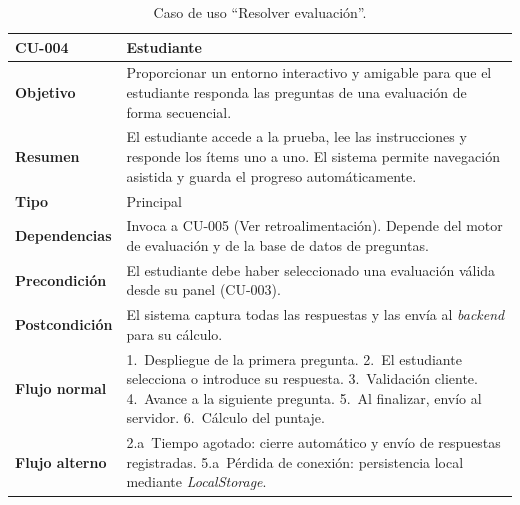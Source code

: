 \begin{table}[H]
\centering
\caption{Caso de uso ``Resolver evaluación''.}
\label{tab:cu_resolver}
\begin{small}
\begin{tabularx}{\textwidth}{|L{3cm}|X|}
\hline
{}
 CU-004 &  Estudiante\\
\hline
\textbf{Objetivo} & Proporcionar un entorno interactivo y amigable para que el estudiante responda las preguntas de una evaluación de forma secuencial.\\
\hline
\textbf{Resumen} & El estudiante accede a la prueba, lee las instrucciones y responde los ítems uno a uno. El sistema permite navegación asistida y guarda el progreso automáticamente.\\
\hline
\textbf{Tipo} & Principal\\
\hline
\textbf{Dependencias} & Invoca a CU-005 (Ver retroalimentación). Depende del motor de evaluación y de la base de datos de preguntas.\\
\hline
\textbf{Precondición} & El estudiante debe haber seleccionado una evaluación válida desde su panel (CU-003).\\
\hline
\textbf{Postcondición} & El sistema captura todas las respuestas y las envía al \textit{backend} para su cálculo.\\
\hline
\textbf{Flujo normal} & 1.~Despliegue de la primera pregunta. 2.~El estudiante selecciona o introduce su respuesta. 3.~Validación cliente. 4.~Avance a la siguiente pregunta. 5.~Al finalizar, envío al servidor. 6.~Cálculo del puntaje.\\
\hline
\textbf{Flujo alterno} & 2.a~Tiempo agotado: cierre automático y envío de respuestas registradas. 5.a~Pérdida de conexión: persistencia local mediante \textit{LocalStorage}.\\
\hline
\end{tabularx}
\end{small}
\fuenteautor
\end{table}

